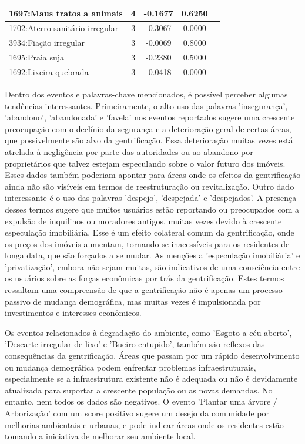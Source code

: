 \begin{table}[htbp]
\begin{tabular}{|l|c|c|c|c|}
		\hline
		1697:Maus tratos a animais               & 4                & -0.1677        & 0.6250           \\
		\hline
		1702:Aterro sanitário irregular          & 3                & -0.3067        & 0.0000           \\
		\hline
		3934:Fiação irregular                    & 3                & -0.0069        & 0.8000           \\
		\hline
		1695:Praia suja                          & 3                & -0.2380        & 0.5000           \\
		\hline
		1692:Lixeira quebrada                    & 3                & -0.0418        & 0.0000           \\
		\hline
	\end{tabular}
\end{table}

Dentro dos eventos e palavras-chave mencionados, é possível perceber algumas tendências interessantes. Primeiramente, o alto uso das palavras 'insegurança', 'abandono', 'abandonada' e 'favela' nos eventos reportados sugere uma crescente preocupação com o declínio da segurança e a deterioração geral de certas áreas, que possivelmente são alvo da gentrificação. Essa deterioração muitas vezes está atrelada à negligência por parte das autoridades ou ao abandono por proprietários que talvez estejam especulando sobre o valor futuro dos imóveis. Esses dados também poderiam apontar para áreas onde os efeitos da gentrificação ainda não são visíveis em termos de reestruturação ou revitalização. Outro dado interessante é o uso das palavras 'despejo', 'despejada' e 'despejados'. A presença desses termos sugere que muitos usuários estão reportando ou preocupados com a expulsão de inquilinos ou moradores antigos, muitas vezes devido à crescente especulação imobiliária. Esse é um efeito colateral comum da gentrificação, onde os preços dos imóveis aumentam, tornando-se inacessíveis para os residentes de longa data, que são forçados a se mudar. As menções a 'especulação imobiliária' e 'privatização', embora não sejam muitas, são indicativos de uma consciência entre os usuários sobre as forças econômicas por trás da gentrificação. Estes termos ressaltam uma compreensão de que a gentrificação não é apenas um processo passivo de mudança demográfica, mas muitas vezes é impulsionada por investimentos e interesses econômicos.

Os eventos relacionados à degradação do ambiente, como 'Esgoto a céu aberto', 'Descarte irregular de lixo' e 'Bueiro entupido', também são reflexos das consequências da gentrificação. Áreas que passam por um rápido desenvolvimento ou mudança demográfica podem enfrentar problemas infraestruturais, especialmente se a infraestrutura existente não é adequada ou não é devidamente atualizada para suportar a crescente população ou as novas demandas. No entanto, nem todos os dados são negativos. O evento 'Plantar uma árvore / Arborização' com um score positivo sugere um desejo da comunidade por melhorias ambientais e urbanas, e pode indicar áreas onde os residentes estão tomando a iniciativa de melhorar seu ambiente local.

